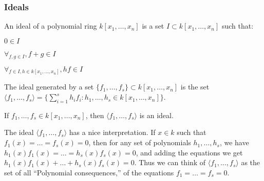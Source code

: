             \subsubsection{Ideals}
                \begin{definition}
                    An ideal of a polynomial ring
                    $k[x_1,\hdots ,x_n]$ is a set
                    $I\subset k[x_1,\hdots ,x_n]$ such that:
                    \begin{enumerate}
                        \begin{multicols}{3}
                            \item $0\in I$
                            \item $\forall_{f,g\in I}, f+g\in I$ 
                            \item $\forall_{f\in I, h\in k[x_1,\hdots ,x_n]},%
                                   hf\in I$
                        \end{multicols}
                    \end{enumerate}
                \end{definition}
                \begin{definition}
                    The ideal generated by a set
                    $\{f_1,\hdots, f_s\}\subset k[x_1,\hdots ,x_n]$
                    is the set
                    $\langle f_1,\hdots,f_s\rangle%
                     =\{\sum_{i=1}^{s} h_i f_i:%
                        h_1,\hdots,h_s\in k[x_1,\hdots ,x_n]\}$.
                \end{definition}
                \begin{theorem}
                    If $f_1,\hdots, f_s\in k[x_1,\hdots ,x_n]$,
                    then $\langle f_1,\hdots, f_s\rangle$ is an ideal.
                \end{theorem}
                \begin{remark}
                    The ideal $\langle f_1,\hdots, f_s\rangle$ has a nice
                    interpretation. If $x\in k$ such that
                    $f_1(x)=\hdots=f_s(x)=0$, then for any set
                    of polynomials $h_1,\hdots, h_s$, we have
                    $h_1(x)f_1(x)=\hdots=h_s(x)f_s(x)=0$,
                    and adding the equations we get
                    $h_1(x)f_1(x)+\hdots+h_s(x)f_s(x)=0$.
                    Thus we can think of
                    $\langle f_1,\hdots,f_s\rangle$ as the set
                    of all ``Polynomial consequences,''
                    of the equations $f_1=\hdots=f_s=0$.
                \end{remark}
